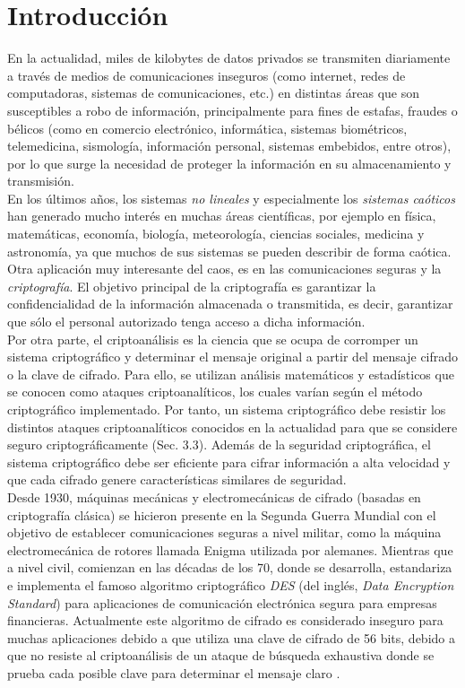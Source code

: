 
\chapter{Introducción}
En la actualidad, miles de kilobytes de datos privados se transmiten diariamente a través de medios de comunicaciones inseguros (como internet, redes de computadoras, sistemas de comunicaciones, etc.) en distintas áreas que son susceptibles a robo de información, principalmente para fines de estafas, fraudes o bélicos (como en comercio electrónico, informática, sistemas biométricos, telemedicina, sismología, información personal, sistemas embebidos,  entre otros), por lo que surge la necesidad de proteger la información en su almacenamiento y transmisión. \\

En los últimos años, los sistemas \textit{no lineales} y especialmente los \textit{sistemas caóticos} han generado mucho interés en muchas áreas científicas, por ejemplo en física, matemáticas, economía, biología, meteorología, ciencias sociales, medicina y astronomía, ya que muchos de sus sistemas se pueden describir de forma caótica. Otra aplicación muy interesante del caos, es en las comunicaciones seguras y la \textit{criptografía}. El objetivo principal de la criptografía es garantizar la confidencialidad de la información almacenada o transmitida, es decir, garantizar que sólo el personal autorizado tenga acceso a dicha información.\\   

Por otra parte, el criptoanálisis es la ciencia que se ocupa de corromper un sistema criptográfico y determinar el mensaje original a partir del mensaje cifrado o la clave de cifrado. Para ello, se utilizan análisis matemáticos y estadísticos que se conocen como ataques criptoanalíticos, los cuales varían según el método criptográfico implementado. Por tanto, un sistema criptográfico debe resistir los distintos ataques criptoanalíticos conocidos en la actualidad para que se considere seguro criptográficamente (Sec. 3.3). Además de la seguridad criptográfica, el sistema criptográfico debe ser eficiente para cifrar información a alta velocidad y que cada cifrado genere características similares de seguridad. \\   

Desde 1930, máquinas mecánicas y electromecánicas de cifrado (basadas en criptografía clásica) se hicieron presente en la Segunda Guerra Mundial con el objetivo de establecer comunicaciones seguras a nivel militar, como la máquina electromecánica de rotores llamada Enigma utilizada por alemanes. Mientras que a nivel civil, comienzan en las décadas de los 70, donde se desarrolla, estandariza e implementa el famoso algoritmo criptográfico \textit{DES} (del inglés, \textit{Data Encryption Standard}) para aplicaciones de comunicación electrónica segura para empresas financieras. Actualmente este algoritmo de cifrado es considerado inseguro para muchas aplicaciones debido a que utiliza una clave de cifrado de 56 bits, debido a que no resiste al criptoanálisis de un ataque de búsqueda exhaustiva donde se prueba cada posible clave para determinar el mensaje claro \cite{E_1998}.\\

